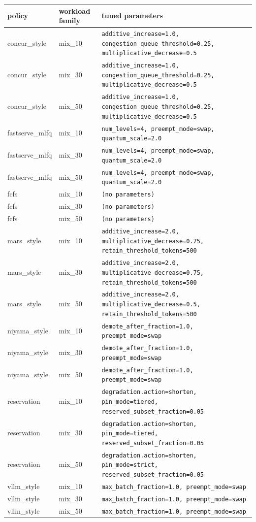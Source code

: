 \begin{tabular}{llp{4.3in}}
\toprule
policy & workload family & tuned parameters \\
\midrule
concur\_style & mix\_10 & \texttt{additive\_increase=1.0, congestion\_queue\_threshold=0.25, multiplicative\_decrease=0.5} \\
concur\_style & mix\_30 & \texttt{additive\_increase=1.0, congestion\_queue\_threshold=0.25, multiplicative\_decrease=0.5} \\
concur\_style & mix\_50 & \texttt{additive\_increase=1.0, congestion\_queue\_threshold=0.25, multiplicative\_decrease=0.5} \\
fastserve\_mlfq & mix\_10 & \texttt{num\_levels=4, preempt\_mode=swap, quantum\_scale=2.0} \\
fastserve\_mlfq & mix\_30 & \texttt{num\_levels=4, preempt\_mode=swap, quantum\_scale=2.0} \\
fastserve\_mlfq & mix\_50 & \texttt{num\_levels=4, preempt\_mode=swap, quantum\_scale=2.0} \\
fcfs & mix\_10 & \texttt{(no parameters)} \\
fcfs & mix\_30 & \texttt{(no parameters)} \\
fcfs & mix\_50 & \texttt{(no parameters)} \\
mars\_style & mix\_10 & \texttt{additive\_increase=2.0, multiplicative\_decrease=0.75, retain\_threshold\_tokens=500} \\
mars\_style & mix\_30 & \texttt{additive\_increase=2.0, multiplicative\_decrease=0.75, retain\_threshold\_tokens=500} \\
mars\_style & mix\_50 & \texttt{additive\_increase=2.0, multiplicative\_decrease=0.5, retain\_threshold\_tokens=500} \\
niyama\_style & mix\_10 & \texttt{demote\_after\_fraction=1.0, preempt\_mode=swap} \\
niyama\_style & mix\_30 & \texttt{demote\_after\_fraction=1.0, preempt\_mode=swap} \\
niyama\_style & mix\_50 & \texttt{demote\_after\_fraction=1.0, preempt\_mode=swap} \\
reservation & mix\_10 & \texttt{degradation.action=shorten, pin\_mode=tiered, reserved\_subset\_fraction=0.05} \\
reservation & mix\_30 & \texttt{degradation.action=shorten, pin\_mode=tiered, reserved\_subset\_fraction=0.05} \\
reservation & mix\_50 & \texttt{degradation.action=shorten, pin\_mode=strict, reserved\_subset\_fraction=0.05} \\
vllm\_style & mix\_10 & \texttt{max\_batch\_fraction=1.0, preempt\_mode=swap} \\
vllm\_style & mix\_30 & \texttt{max\_batch\_fraction=1.0, preempt\_mode=swap} \\
vllm\_style & mix\_50 & \texttt{max\_batch\_fraction=1.0, preempt\_mode=swap} \\
\bottomrule
\end{tabular}
